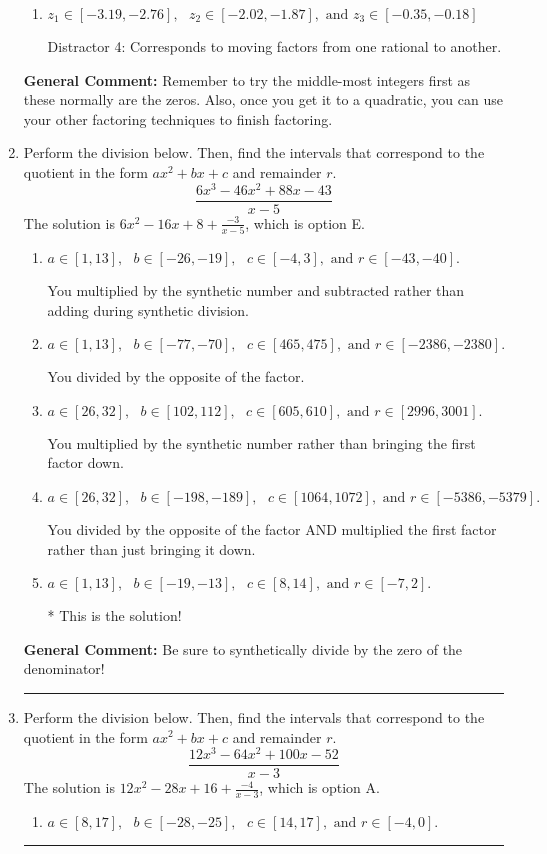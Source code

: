 \documentclass{extbook}[14pt]
\newcommand{\litem}[1]{\item #1

\rule{\textwidth}{0.4pt}}
\begin{document}
\begin{enumerate}
{\begin{enumerate}[label=\Alph*.]
 Distractor 1: Corresponds to negatives of all zeros.
\item \( z_1 \in [-3.19, -2.76], \text{   }  z_2 \in [-2.02, -1.87], \text{   and   } z_3 \in [-0.35, -0.18] \)

 Distractor 4: Corresponds to moving factors from one rational to another.
\end{enumerate}

\textbf{General Comment:} Remember to try the middle-most integers first as these normally are the zeros. Also, once you get it to a quadratic, you can use your other factoring techniques to finish factoring.
}
\litem{
Perform the division below. Then, find the intervals that correspond to the quotient in the form $ax^2+bx+c$ and remainder $r$.
\[ \frac{6x^{3} -46 x^{2} +88 x -43}{x -5} \]The solution is \( 6x^{2} -16 x + 8 + \frac{-3}{x -5} \), which is option E.\begin{enumerate}[label=\Alph*.]
\item \( a \in [1, 13], \text{   } b \in [-26, -19], \text{   } c \in [-4, 3], \text{   and   } r \in [-43, -40]. \)

 You multiplied by the synthetic number and subtracted rather than adding during synthetic division.
\item \( a \in [1, 13], \text{   } b \in [-77, -70], \text{   } c \in [465, 475], \text{   and   } r \in [-2386, -2380]. \)

 You divided by the opposite of the factor.
\item \( a \in [26, 32], \text{   } b \in [102, 112], \text{   } c \in [605, 610], \text{   and   } r \in [2996, 3001]. \)

 You multiplied by the synthetic number rather than bringing the first factor down.
\item \( a \in [26, 32], \text{   } b \in [-198, -189], \text{   } c \in [1064, 1072], \text{   and   } r \in [-5386, -5379]. \)

 You divided by the opposite of the factor AND multiplied the first factor rather than just bringing it down.
\item \( a \in [1, 13], \text{   } b \in [-19, -13], \text{   } c \in [8, 14], \text{   and   } r \in [-7, 2]. \)

* This is the solution!
\end{enumerate}

\textbf{General Comment:} Be sure to synthetically divide by the zero of the denominator!
}
\litem{
Perform the division below. Then, find the intervals that correspond to the quotient in the form $ax^2+bx+c$ and remainder $r$.
\[ \frac{12x^{3} -64 x^{2} +100 x -52}{x -3} \]The solution is \( 12x^{2} -28 x + 16 + \frac{-4}{x -3} \), which is option A.\begin{enumerate}[label=\Alph*.]
\item \( a \in [8, 17], \text{   } b \in [-28, -25], \text{   } c \in [14, 17], \text{   and   } r \in [-4, 0]. \)


\end{enumerate}}
\end{enumerate}
\end{document}
